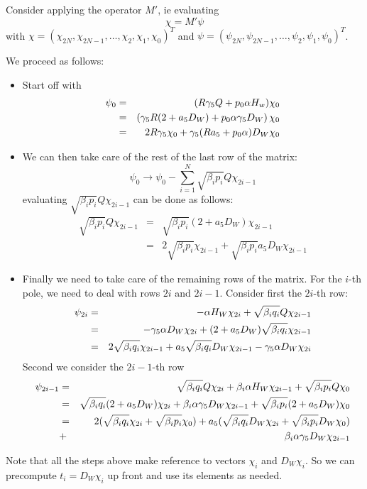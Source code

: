 \documentclass[12pt]{article}
\begin{document}
Consider applying the operator $M'$, ie evaluating
\begin{equation}
\chi = M' \psi
\end{equation}
with $\chi=( \chi_{2N}, \chi_{2N-1}, \ldots, \chi_{2}, \chi_{1}, \chi_{0} )^{T}$ and $\psi=( \psi_{2N}, \psi_{2N-1}, \ldots, \psi_{2}, \psi_{1}, \psi_{0} )^{T}$.

We proceed as follows:
\begin{itemize}
\item
Start off with 
\begin{eqnarray}
\psi_{0} &=& (R\gamma_5 Q + p_0 \alpha H_w) \chi_0 \\
         &=& \left( \gamma_5 R ( 2 + a_5 D_W ) + p_0 \alpha \gamma_5 D_W \right) \chi_0 \\
         &=& 2 R \gamma_5 \chi_0 + \gamma_5 ( R a_5 + p_0 \alpha ) D_W \chi_0
\end{eqnarray}
\item
We can then take care of the rest of the last row of the matrix:
\begin{equation}
\psi_0 \rightarrow \psi_0 - \sum_{i=1}^{N} \sqrt{\beta_{i} p_{i}} Q \chi_{2i-1} 
\end{equation}
evaluating $  \sqrt{\beta_{i} p_{i}} Q \chi_{2i-1}$ can be done as follows:
\begin{eqnarray}
 \sqrt{\beta_{i} p_{i}} Q \chi_{2i-1} &=&  \sqrt{\beta_{i} p_{i}} ( 2 + a_5 D_W ) \chi_{2i-1} \\
 &=&  2 \sqrt{\beta_{i} p_{i}} \chi_{2i-1} + \sqrt{\beta_{i} p_{i}} a_5 D_W \chi_{2i-1}
\end{eqnarray}
\item
Finally we need to take care of the remaining rows of the matrix. For the 
$i$-th pole, we need to deal with rows $2i$ and $2i-1$.
Consider first the $2i$-th row:
\begin{eqnarray}
\psi_{2i} &=& -\alpha H_W \chi_{2i} + \sqrt{\beta_{i} q_{i}} Q \chi_{2i-1} \\
 &=& -\gamma_5 \alpha D_W \chi_{2i} + (2 + a_5 D_W)  \sqrt{\beta_{i} q_{i}}\chi_{2i-1} \\
 &=& 2 \sqrt{\beta_{i} q_{i}}\chi_{2i-1} + a_5 \sqrt{\beta_{i} q_{i}} D_W \chi_{2i-1} - \gamma_5 \alpha D_W \chi_{2i}
\end{eqnarray}
Second we consider the $2i-1$-th row
\begin{eqnarray}
\psi_{2i-1} &=& \sqrt{ \beta_{i} q_i } Q \chi_{2i} + \beta_i \alpha H_W \chi_{2i-1} + \sqrt{\beta_i p_i} Q \chi_{0} \\
 &=&  \sqrt{ \beta_{i} q_i } (2 + a_5 D_W) \chi_{2i} +  \beta_i \alpha \gamma_5 D_W \chi_{2i-1}  + \sqrt{\beta_i p_i} (2 + a_5 D_W) \chi_{0} \\
 &=& 2 ( \sqrt{ \beta_{i} q_i } \chi_{2i} + \sqrt{\beta_i p_i} \chi_0 ) + a_5 (  \sqrt{ \beta_{i} q_i } D_W \chi_{2i} +  \sqrt{\beta_i p_i} D_W \chi_0 )\nonumber \\   &+&  \beta_i \alpha \gamma_5 D_W \chi_{2i-1}
\end{eqnarray}
\end{itemize}
Note that all the steps above make reference to vectors $\chi_i$ and $D_W \chi_i$. So we can precompute $t_{i} = D_W \chi_i$ up front and use its elements
as needed.
\end{document}
